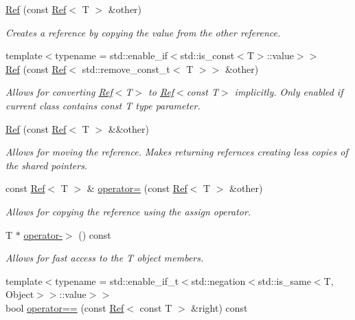 \begin{DoxyCompactItemize}
\mbox{\hyperlink{class_ref_af5a5311e5afb91b98e20c5d96c3ae31b}{Ref}} (const \mbox{\hyperlink{class_ref}{Ref}}$<$ T $>$ \&other)
\begin{DoxyCompactList}\small\item\em Creates a reference by copying the value from the other reference. \end{DoxyCompactList}\item 
{\footnotesize template$<$typename  = std\+::enable\+\_\+if$<$std\+::is\+\_\+const$<$\+T$>$\+::value$>$$>$ }\\\mbox{\hyperlink{class_ref_a0ff7c9e8c09bd700086040b8b6f89a35}{Ref}} (const \mbox{\hyperlink{class_ref}{Ref}}$<$ std\+::remove\+\_\+const\+\_\+t$<$ T $>$$>$ \&other)
\begin{DoxyCompactList}\small\item\em Allows for converting \mbox{\hyperlink{class_ref}{Ref}}$<$T$>$ to \mbox{\hyperlink{class_ref}{Ref}}$<$const T$>$ implicitly. Only enabled if current class contains const T type parameter. \end{DoxyCompactList}\item 
\mbox{\hyperlink{class_ref_a56886343e7faf21e18bec16042535cf5}{Ref}} (const \mbox{\hyperlink{class_ref}{Ref}}$<$ T $>$ \&\&other)
\begin{DoxyCompactList}\small\item\em Allows for moving the reference. Makes returning refernces creating less copies of the shared pointers. \end{DoxyCompactList}\item 
const \mbox{\hyperlink{class_ref}{Ref}}$<$ T $>$ \& \mbox{\hyperlink{class_ref_aaf07d54c8951e7f026faef51950c18a6}{operator=}} (const \mbox{\hyperlink{class_ref}{Ref}}$<$ T $>$ \&other)
\begin{DoxyCompactList}\small\item\em Allows for copying the reference using the assign operator. \end{DoxyCompactList}\item 
T $\ast$ \mbox{\hyperlink{class_ref_a8a8746320aa81f63d923172305b8d173}{operator-\/$>$}} () const
\begin{DoxyCompactList}\small\item\em Allows for fast access to the T object members. \end{DoxyCompactList}\item 
{\footnotesize template$<$typename  = std\+::enable\+\_\+if\+\_\+t$<$std\+::negation$<$std\+::is\+\_\+same$<$\+T, Object$>$$>$\+::value$>$$>$ }\\bool \mbox{\hyperlink{class_ref_aab8b77f0e2128c4c373909703e14df5d}{operator==}} (const \mbox{\hyperlink{class_ref}{Ref}}$<$ const T $>$ \&right) const
$$
\end{DoxyCompactItemize}
